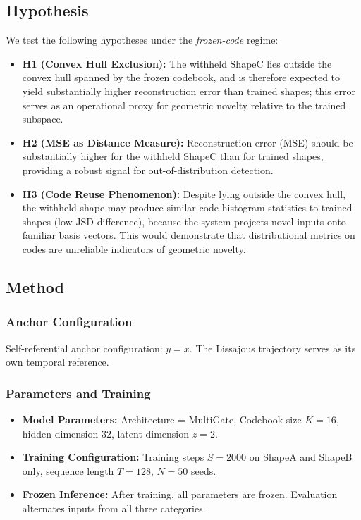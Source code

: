 \documentclass{article}
\begin{document}
\subsection{Hypothesis}
We test the following hypotheses under the \emph{frozen-code} regime:
\begin{itemize}
    \item \textbf{H1 (Convex Hull Exclusion):} The withheld ShapeC lies outside the convex hull spanned by the frozen codebook, and is therefore expected to yield substantially higher reconstruction error than trained shapes; this error serves as an operational proxy for geometric novelty relative to the trained subspace.
    \item \textbf{H2 (MSE as Distance Measure):} Reconstruction error (MSE) should be substantially higher for the withheld ShapeC than for trained shapes, providing a robust signal for out-of-distribution detection.
    \item \textbf{H3 (Code Reuse Phenomenon):} Despite lying outside the convex hull, the withheld shape may produce similar code histogram statistics to trained shapes (low JSD difference), because the system projects novel inputs onto familiar basis vectors. This would demonstrate that distributional metrics on codes are unreliable indicators of geometric novelty.
\end{itemize}

\subsection{Method}

\subsubsection{Anchor Configuration}
Self-referential anchor configuration: $y = x$. The Lissajous trajectory serves as its own temporal reference.

\subsubsection{Parameters and Training}
\begin{itemize}
    \item \textbf{Model Parameters:} Architecture = MultiGate, Codebook size $K=16$, hidden dimension $32$, latent dimension $z=2$.
    \item \textbf{Training Configuration:} Training steps $S=2000$ on ShapeA and ShapeB only, sequence length $T=128$, $N=50$ seeds.
    \item \textbf{Frozen Inference:} After training, all parameters are frozen. Evaluation alternates inputs from all three categories.
\end{itemize}
\end{document}
